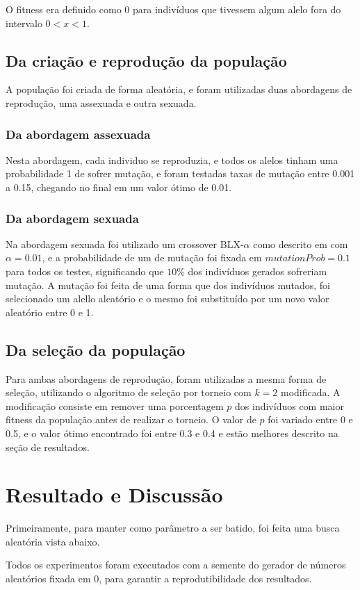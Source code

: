\documentclass[12pt]{article}
\begin{document}
O fitness era definido como 0 para indivíduos que tivessem algum alelo fora do intervalo \(0<x<1\).
\subsection{Da criação e reprodução da população}
A população foi criada de forma aleatória, e foram utilizadas duas abordagens de reprodução, uma assexuada e outra sexuada.
\subsubsection{Da abordagem assexuada}
Nesta abordagem, cada individuo se reproduzia, e todos os alelos tinham uma probabilidade 1 de sofrer mutação, e foram testadas taxas de mutação entre 0.001 a 0.15, chegando no final em um valor ótimo de 0.01.
\subsubsection{Da abordagem sexuada}
Na abordagem sexuada foi utilizado um crossover BLX-$\alpha$  como descrito em \cite{de2002tutorial} com $\alpha=0.01$, e a probabilidade de um  de mutação foi fixada em $mutationProb=0.1$ para todos os testes, significando que $10\%$ dos indivíduos gerados sofreriam mutação. A mutação foi feita de uma forma que dos indivíduos mutados, foi selecionado um alello aleatório e o mesmo foi substituído por um novo valor aleatório entre 0 e 1.

\subsection{Da seleção da população}

Para ambas abordagens de reprodução, foram utilizadas a mesma forma de seleção, utilizando o algoritmo de seleção por torneio com \(k=2\) modificada. A modificação consiste em remover uma porcentagem \(p\) dos indivíduos com maior fitness da população antes de realizar o torneio. O valor de \(p\) foi variado entre 0 e 0.5, e o valor ótimo encontrado foi entre 0.3 e 0.4 e estão melhores descrito na seção de resultados.
\section{Resultado e Discussão}

Primeiramente, para manter como parâmetro a ser batido, foi feita uma busca aleatória vista abaixo.

Todos os experimentos foram executados com a semente do gerador de números aleatórios fixada em 0, para garantir a reprodutibilidade dos resultados.
\end{document}
